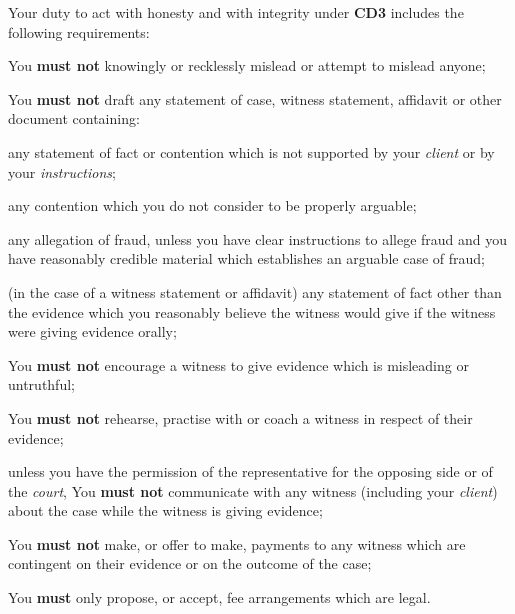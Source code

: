Your duty to act with honesty and with integrity under  \textbf{\textcolor{mygold}{CD3}} includes the
following requirements:
\begin{numlist}\item You \textcolor{myred}{\textbf{must not}} knowingly or recklessly mislead or attempt to mislead
anyone;
\item You \textcolor{myred}{\textbf{must not}} draft any statement of case, witness statement,
affidavit or other document containing:
\begin{alphlist}\item any statement of fact or contention which is not supported by your
\emph{client} or by your \emph{instructions};
\item any contention which you do not consider to be properly arguable;
\item any allegation of fraud, unless you have clear instructions to allege
fraud and you have reasonably credible material which establishes an
arguable case of fraud;
\item (in the case of a witness statement or affidavit) any statement of
fact other than the evidence which you reasonably believe the witness
would give if the witness were giving evidence orally;\end{alphlist}
\item You \textcolor{myred}{\textbf{must not}} encourage a witness to give evidence which is misleading
or untruthful;
\item You \textcolor{myred}{\textbf{must not}} rehearse, practise with or coach a witness in respect of
their evidence;
\item unless you have the permission of the representative for the opposing
side or of the \emph{court}, You \textcolor{myred}{\textbf{must not}} communicate with any witness
(including your \emph{client}) about the case while the witness is
giving evidence;
\item You \textcolor{myred}{\textbf{must not}} make, or offer to make, payments to any witness which
are contingent on their evidence or on the outcome of the case;
\item You \textcolor{myred}{\textbf{must}} only propose, or accept, fee arrangements which are legal.

\end{numlist}



